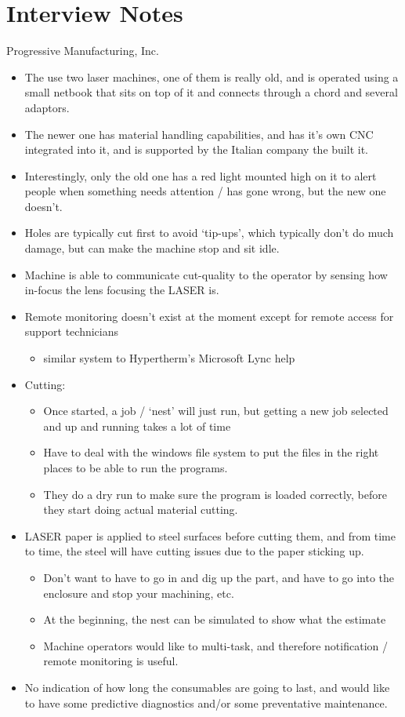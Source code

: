 \documentclass[12pt,letterpaper,titlepage]{article}
\newlength{\wideitemsep}
\let\olditem\item
\renewcommand{\item}{\setlength{\itemsep}{\wideitemsep}\olditem}
\begin{document}
\newpage
\section{Interview Notes} \label{InterviewNotes}
Progressive Manufacturing, Inc.

\begin{itemize}
\item The use two laser machines, one of them is really old, and is operated using a small netbook that sits on top of it and connects through a chord and several adaptors.
\item The newer one has material handling capabilities, and has it’s own CNC integrated into it, and is supported by the Italian company the built it.
\item Interestingly, only the old one has a red light mounted high on it to alert people when something needs attention / has gone wrong, but the new one doesn’t.
\item Holes are typically cut first to avoid ‘tip-ups’, which typically don’t do much damage, but can make the machine stop and sit idle.
\item Machine is able to communicate cut-quality to the operator by sensing how in-focus the lens focusing the LASER is.
\item Remote monitoring doesn’t exist at the moment except for remote access for support technicians
\begin{itemize}
\item similar system to Hypertherm’s Microsoft Lync help
\end{itemize}
\item Cutting:
\begin{itemize}
\item Once started, a job / ‘nest’ will just run, but getting a new job selected and up and running takes a lot of time
\item Have to deal with the windows file system to put the files in the right places to be able to run the programs.
\item They do a dry run to make sure the program is loaded correctly, before they start doing actual material cutting.
\end{itemize}
\item LASER paper is applied to steel surfaces before cutting them, and from time to time, the steel will have cutting issues due to the paper sticking up.
\begin{itemize}
\item Don’t want to have to go in and dig up the part, and have to go into the enclosure and stop your machining, etc.
\item At the beginning, the nest can be simulated to show what the estimate 
\item Machine operators would like to multi-task, and therefore notification / remote monitoring is useful.
\end{itemize}
\item No indication of how long the consumables are going to last, and would like to have some predictive diagnostics and/or some preventative maintenance.
\end{itemize}
\end{document}
